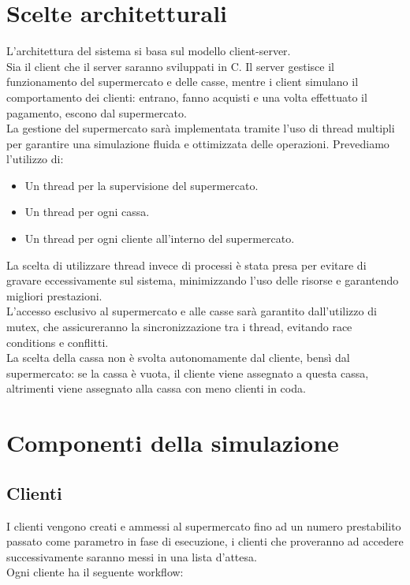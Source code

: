 \documentclass[a4paper, 12pt]{article}
\begin{document}
\section{Scelte architetturali}
L'architettura del sistema si basa sul modello client-server. \\
Sia il client che il server saranno sviluppati in C. Il server gestisce il
funzionamento del supermercato e delle casse, mentre i client simulano il 
comportamento dei clienti: entrano, fanno acquisti e una volta effettuato il 
pagamento, escono dal supermercato. \\
La gestione del supermercato sarà implementata tramite l'uso di thread multipli
per garantire una simulazione fluida e ottimizzata delle operazioni.
Prevediamo l'utilizzo di:
\begin{itemize}[noitemsep,topsep=0pt,parsep=0pt,partopsep=0pt]
    \item Un thread per la supervisione del supermercato.
    \item Un thread per ogni cassa.
    \item Un thread per ogni cliente all'interno del supermercato.
\end{itemize}

La scelta di utilizzare thread invece di processi è stata presa per evitare di
gravare eccessivamente sul sistema, minimizzando l'uso delle risorse e garantendo
migliori prestazioni. \\
L'accesso esclusivo al supermercato e alle casse sarà garantito dall'utilizzo di 
mutex, che assicureranno la sincronizzazione tra i thread, evitando race conditions
e conflitti. \\
La scelta della cassa non è svolta autonomamente dal cliente, bensì dal supermercato:
se la cassa è vuota, il cliente viene assegnato a questa cassa, altrimenti viene
assegnato alla cassa con meno clienti in coda.

\section{Componenti della simulazione}

\subsection{Clienti}
I clienti vengono creati e ammessi al supermercato fino ad un numero prestabilito
passato come parametro in fase di esecuzione, i clienti che proveranno ad accedere
successivamente saranno messi in una lista d'attesa. \\
Ogni cliente ha il seguente workflow:
\end{document}
